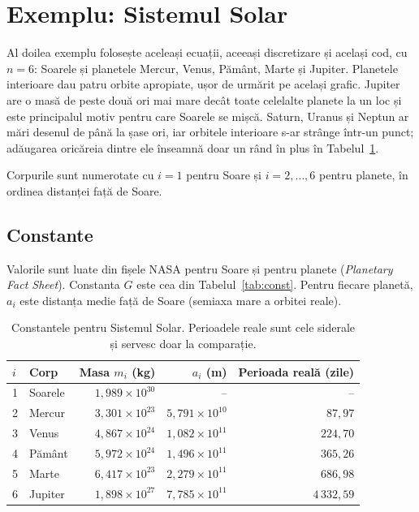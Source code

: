 \documentclass[11pt,a4paper]{article}
\begin{document}
\section{Exemplu: Sistemul Solar}\label{sec:solar}
Al doilea exemplu folosește aceleași ecuații, aceeași discretizare și același cod, cu $n = 6$: Soarele și planetele Mercur, Venus, Pământ, Marte și Jupiter. Planetele interioare dau patru orbite apropiate, ușor de urmărit pe același grafic. Jupiter are o masă de peste două ori mai mare decât toate celelalte planete la un loc și este principalul motiv pentru care Soarele se mișcă. Saturn, Uranus și Neptun ar mări desenul de până la șase ori, iar orbitele interioare s-ar strânge într-un punct; adăugarea oricăreia dintre ele înseamnă doar un rând în plus în Tabelul~\ref{tab:solar}.

Corpurile sunt numerotate cu $i = 1$ pentru Soare și $i = 2, \dots, 6$ pentru planete, în ordinea distanței față de Soare.

\subsection*{Constante}
Valorile sunt luate din fișele NASA pentru Soare și pentru planete (\emph{Planetary Fact Sheet}). Constanta $G$ este cea din Tabelul~\ref{tab:const}. Pentru fiecare planetă, $a_i$ este distanța medie față de Soare (semiaxa mare a orbitei reale).

\begin{table}[H]
\centering
\begin{tabular}{@{}llrrr@{}}
\toprule
$i$ & Corp & Masa $m_i$ (kg) & $a_i$ (m) & Perioada reală (zile) \\
\midrule
1 & Soarele & $1{,}989\times10^{30}$ & -- & -- \\
2 & Mercur  & $3{,}301\times10^{23}$ & $5{,}791\times10^{10}$ & $87{,}97$ \\
3 & Venus   & $4{,}867\times10^{24}$ & $1{,}082\times10^{11}$ & $224{,}70$ \\
4 & Pământ  & $5{,}972\times10^{24}$ & $1{,}496\times10^{11}$ & $365{,}26$ \\
5 & Marte   & $6{,}417\times10^{23}$ & $2{,}279\times10^{11}$ & $686{,}98$ \\
6 & Jupiter & $1{,}898\times10^{27}$ & $7{,}785\times10^{11}$ & $4\,332{,}59$ \\
\bottomrule
\end{tabular}
\caption{Constantele pentru Sistemul Solar. Perioadele reale sunt cele siderale și servesc doar la comparație.}
\label{tab:solar}
\end{table}
\end{document}
